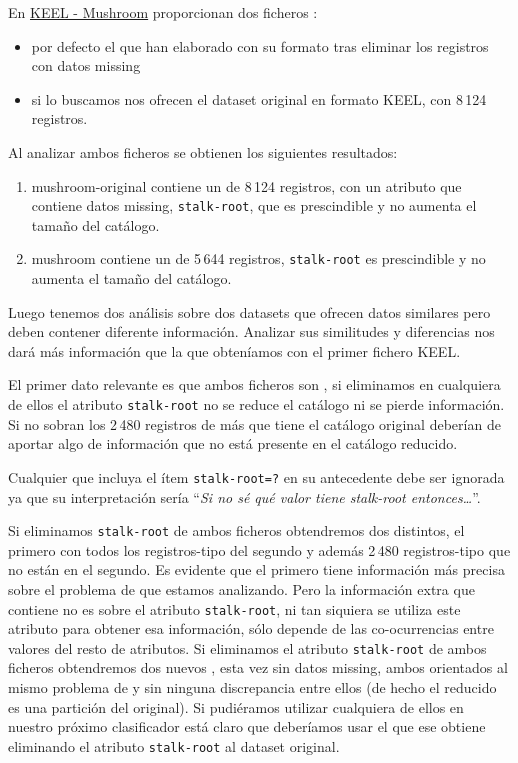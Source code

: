 En \href{http://sci2s.ugr.es/keel/dataset.php?cod=178}{KEEL - Mushroom} proporcionan dos ficheros \mushroom:
\begin{itemize}
  \item por defecto el que han elaborado con su formato tras eliminar los registros con datos missing
  \item si lo buscamos nos ofrecen el dataset original en formato KEEL, con 8\,124 registros.
\end{itemize}

Al analizar ambos ficheros se obtienen los siguientes resultados:
\begin{enumerate}
  \item mushroom-original contiene un \CC de 8\,124 registros, con un atributo que contiene datos missing, \texttt{stalk-root}, que es prescindible y no aumenta el tamaño del catálogo.
  \item mushroom contiene un \CC de 5\,644 registros, \texttt{stalk-root} es prescindible y no aumenta el tamaño del catálogo.
\end{enumerate}
Luego tenemos dos análisis sobre dos datasets que ofrecen datos similares pero deben contener diferente información. Analizar sus similitudes y diferencias nos dará más información que la que obteníamos con el primer fichero KEEL.

El primer dato relevante es que ambos ficheros son \CCs, si eliminamos en cualquiera de ellos el atributo \texttt{stalk-root} no se reduce el catálogo ni se pierde información. Si no sobran los 2\,480 registros de más que tiene el catálogo original deberían de aportar algo de información que no está presente en el catálogo reducido.

Cualquier \ar que incluya el ítem \texttt{stalk-root=?} en su antecedente debe ser ignorada ya que su interpretación sería ``\emph{Si no sé qué valor tiene stalk-root entonces\ldots}''.

Si eliminamos \texttt{stalk-root} de ambos ficheros obtendremos dos \CCs distintos, el primero con todos los registros-tipo del segundo y además 2\,480 registros-tipo que no están en el segundo. Es evidente que el primero tiene información más precisa sobre el problema de \clasificacion que estamos analizando. Pero la información extra que contiene no es sobre el atributo \texttt{stalk-root}, ni tan siquiera se utiliza este atributo para obtener esa información, sólo depende de las co-ocurrencias entre valores del resto de atributos. Si eliminamos el atributo \texttt{stalk-root} de ambos ficheros obtendremos dos nuevos \CCs, esta vez sin datos missing, ambos orientados al mismo problema de \clasificacion y sin ninguna discrepancia entre ellos (de hecho el reducido es una partición del original). Si pudiéramos utilizar cualquiera de ellos en nuestro próximo clasificador está claro que deberíamos usar el \CC que ese obtiene eliminando el atributo \texttt{stalk-root} al dataset original.

